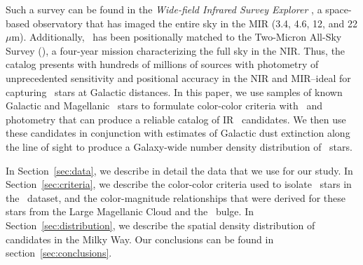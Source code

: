 Such a survey can be found in the \emph{Wide-field Infrared Survey Explorer} \citep[\wise, ][]{2010AJ....140.1868W, 2012wise.rept....1C}, a space-based observatory that has imaged the entire sky in the MIR (3.4, 4.6, 12, and 22$\mu$m). Additionally, \wise\, has been positionally matched to the Two-Micron All-Sky Survey (\twomass), a four-year mission characterizing the full sky in the NIR. Thus, the \wise\, catalog presents with hundreds of millions of sources with photometry of unprecedented sensitivity and positional accuracy in the NIR and MIR--ideal for capturing \agb\, stars at Galactic distances. In this paper, we use samples of known Galactic and Magellanic \agb\, stars to formulate color-color criteria with \wise\, and \twomass\, photometry that can produce a reliable catalog of IR \agb\, candidates. We then use these candidates in conjunction with estimates of Galactic dust extinction along the line of sight to produce a Galaxy-wide number density distribution of \agb\, stars.  

In Section~\ref{sec:data}, we describe in detail the data that we use for our study. In Section~\ref{sec:criteria}, we describe the color-color criteria used to isolate \agb\, stars in the \wise\, dataset, and the color-magnitude relationships that were derived for these stars from the Large Magellanic Cloud and the \mw\, bulge.
In Section~\ref{sec:distribution}, we describe the spatial density distribution of \agb\, candidates in the Milky Way.
Our conclusions can be found in section~\ref{sec:conclusions}.
